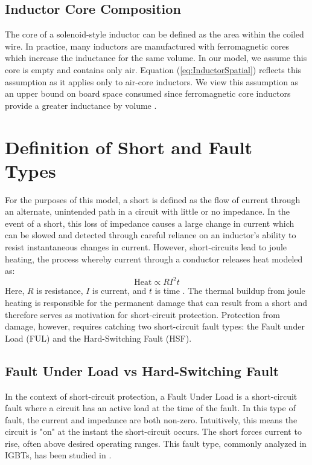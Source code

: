 \documentclass[11pt,oneside]{report}
\begin{document}
    \subsection*{Inductor Core Composition}
    The core of a solenoid-style inductor can be defined as the area within the coiled wire. In practice, many inductors are manufactured with ferromagnetic cores which increase the inductance for the same volume. In our model, we assume this core is empty and contains only air. Equation (\ref{eq:InductorSpatial}) reflects this assumption as it applies only to air-core inductors. We view this assumption as an upper bound on board space consumed since ferromagnetic core inductors provide a greater inductance by volume \cite{NiFe}.
    
    \section*{Definition of Short and Fault Types}
    For the purposes of this model, a short is defined as the flow of current through an alternate, unintended path in a circuit with little or no impedance. In the event of a short, this loss of impedance causes a large change in current which can be slowed and detected through careful reliance on an inductor's ability to resist instantaneous changes in current. However, short-circuits lead to joule heating, the process whereby current through a conductor releases heat modeled as:
    \begin{equation}\label{eq:JouleHeating}
    \text{Heat} \propto R I^{2} t
    \end{equation}
    Here, $R$ is resistance, $I$ is current, and $t$ is time \cite{uniphy}. The thermal buildup from joule heating is responsible for the permanent damage that can result from a short and therefore serves as motivation for short-circuit protection. Protection from damage, however, requires catching two short-circuit fault types: the Fault under Load (FUL) and the Hard-Switching Fault (HSF).
    
    \subsection*{Fault Under Load vs Hard-Switching Fault}
    In the context of short-circuit protection, a Fault Under Load is a short-circuit fault where a circuit has an active load at the time of the fault. In this type of fault, the current and impedance are both non-zero. Intuitively, this means the circuit is "on" at the instant the short-circuit occurs. The short forces current to rise, often above desired operating ranges. This fault type, commonly analyzed in IGBTs, has been studied in \cite{scanalysis}.
    
\end{document}
